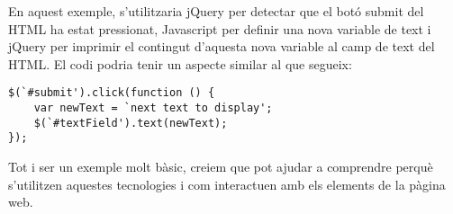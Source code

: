     En aquest exemple, s'utilitzaria jQuery per detectar que el botó submit del HTML ha estat pressionat, Javascript per definir una nova variable de text i jQuery per imprimir el contingut d’aquesta nova variable al camp de text del HTML. El codi podria tenir un aspecte similar al que segueix:

\begin{lstlisting}[style=rawOwn,caption={Example of jQuery and Javascript}]
$(`#submit').click(function () {
	var newText = `next text to display';
	$(`#textField').text(newText);
});
\end{lstlisting}

    Tot i ser un exemple molt bàsic, creiem que pot ajudar a comprendre perquè s'utilitzen aquestes tecnologies i com interactuen amb els elements de la pàgina web.

